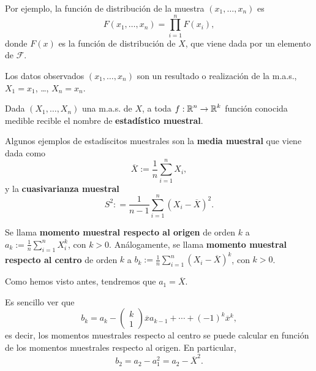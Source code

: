 \begin{observation}
Por ejemplo, la función de distribución de la muestra $\displaystyle \left(x_{1}, \ldots, x_{n}\right) $ es
\[F\left(x_{1}, \ldots, x_{n}\right)=\prod^{n}_{i = 1}F\left(x_{i}\right) ,\]
donde $\displaystyle F\left(x\right) $ es la función de distribución de $\displaystyle X $, que viene dada por un elemento de $\displaystyle \mathcal{F} $. 
\end{observation}
\begin{observation}
Los datos observados $\displaystyle \left(x_{1}, \ldots, x_{n}\right) $ son un resultado o realización de la m.a.s., $\displaystyle X_{1} = x_{1} $, \ldots, $\displaystyle X_{n}=x_{n} $. 
\end{observation}

\begin{definition}
Dada $\displaystyle \left(X_{1}, \ldots, X_{n}\right) $ una m.a.s. de $\displaystyle X $, a toda $\displaystyle f : \mathbb{R}^{n} \to \mathbb{R}^{k} $ función conocida medible recible el nombre de \textbf{estadístico muestral}.
\end{definition}
\begin{eg}
Algunos ejemplos de estadíscitos muestrales son la \textbf{media muestral} que viene dada como 
\[\overline{X}:=\frac{1}{n}\sum^{n}_{i = 1}X_{i} ,\]
y la \textbf{cuasivarianza muestral} 
\[S^{2} : = \frac{1}{n-1}\sum^{n}_{i = 1}\left(X_{i}-\overline{X}\right)^{2} .\]
\end{eg}
\begin{definition}
Se llama \textbf{momento muestral respecto al origen} de orden $\displaystyle k $ a $\displaystyle a_{k}:=\frac{1}{n}\sum^{n}_{i = 1}X_{i}^{k} $, con $\displaystyle k > 0 $. Análogamente, se llama \textbf{momento muestral respecto al centro} de orden $\displaystyle k $ a $\displaystyle b_{k} := \frac{1}{n}\sum^{n}_{i = 1}\left(X_{i}-\overline{X}\right)^{k} $, con $\displaystyle k > 0 $.
\end{definition}
\begin{eg}
Como hemos visto antes, tendremos que $\displaystyle a_{1}= \overline{X} $. 
\end{eg}
\begin{observation}
Es sencillo ver que 
\[b_{k}= a_{k}-\begin{pmatrix} k \\ 1 \end{pmatrix}\overline{x}a_{k-1} + \cdots + \left(-1\right)^{k}\overline{x}^{k} ,\]
es decir, los momentos muestrales respecto al centro se puede calcular en función de los momentos muestrales respecto al origen. En particular,
\[b_{2}=a_{2} - a_{1}^{2} = a_{2}-\overline{X}^{2} .\]
\end{observation}
